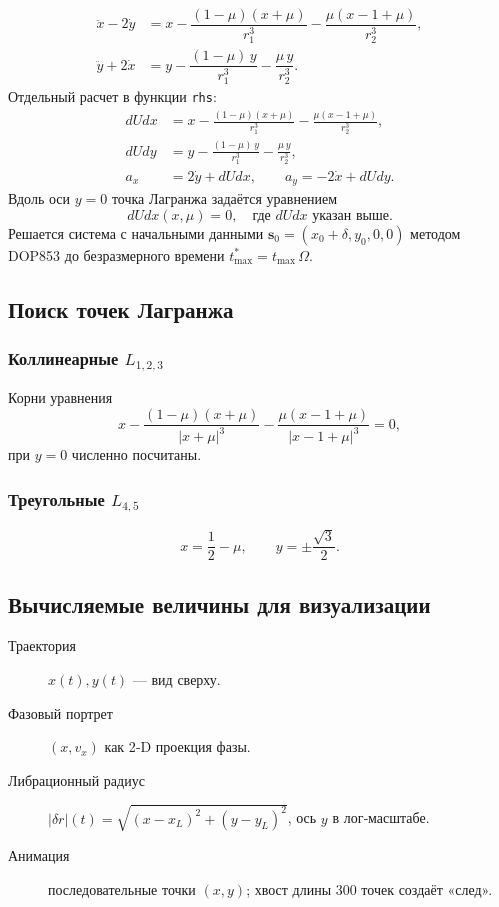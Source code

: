\documentclass[12pt]{article}
\begin{document}
\[
\boxed{
\begin{aligned}
\ddot x-2\dot y &=
  x-\dfrac{(1-\mu)(x+\mu)}{r_1^{3}}
    -\dfrac{\mu(x-1+\mu)}{r_2^{3}},\\[6pt]
\ddot y+2\dot x &=
  y-\dfrac{(1-\mu)\,y}{r_1^{3}}
    -\dfrac{\mu\,y}{r_2^{3}}.
\end{aligned}}
\tag{EOM}
\]
Отдельный расчет в функции \texttt{rhs}:
\begin{align*}
dUdx &= x-\frac{(1-\mu)(x+\mu)}{r_1^{3}}
           -\frac{\mu(x-1+\mu)}{r_2^{3}},\\
dUdy &= y-\frac{(1-\mu)\,y}{r_1^{3}}
           -\frac{\mu\,y}{r_2^{3}},\\
a_x &=  2\dot y + dUdx,\qquad
a_y = -2\dot x + dUdy.
\end{align*}
Вдоль оси $y=0$ точка Лагранжа задаётся уравнением  
\[
dUdx(x,\mu)=0,
\quad\text{где }dUdx \text{ указан выше}.
\]
Решается система с начальными данными  
\(\mathbf s_0=(x_0+\delta,y_0,0,0)\)
методом DOP853 до безразмерного времени
\(t_{\max}^{*}=t_{\max}\,\Omega\).

\subsection{Поиск точек Лагранжа}

\subsubsection{Коллинеарные $L_{1,2,3}$}
Корни уравнения
\[
x-\frac{(1-\mu)(x+\mu)}{|x+\mu|^{3}}
 -\frac{\mu(x-1+\mu)}{|x-1+\mu|^{3}}=0,
\]
при $y=0$ численно посчитаны.
\subsubsection{Треугольные $L_{4,5}$}
\[
x=\frac12-\mu,\qquad
y=\pm\frac{\sqrt3}{2}.
\]

\subsection{Вычисляемые величины для визуализации}

\begin{description}
  \item[Траектория] $x(t),y(t)$ — вид сверху.
  \item[Фазовый портрет] $(x,v_x)$ как 2‑D проекция фазы.
  \item[Либрационный радиус] $|\delta r|(t)
    =\sqrt{(x-x_L)^2+(y-y_L)^2}$, ось $y$ в лог‑масштабе.
  \item[Анимация] последовательные точки $(x,y)$;
        хвост длины 300 точек создаёт «след».
\end{description}
\end{document}
